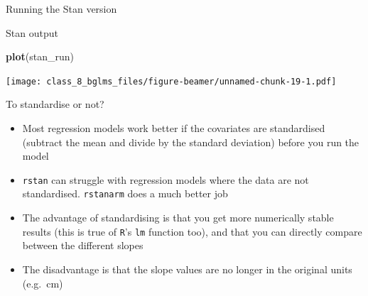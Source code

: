\documentclass[ignorenonframetext,]{beamer}
\newenvironment{Shaded}{\begin{snugshade}}{\end{snugshade}}
\newcommand{\KeywordTok}[1]{\textcolor[rgb]{0.13,0.29,0.53}{\textbf{#1}}}
\newcommand{\DataTypeTok}[1]{\textcolor[rgb]{0.13,0.29,0.53}{#1}}
\newcommand{\StringTok}[1]{\textcolor[rgb]{0.31,0.60,0.02}{#1}}
\newcommand{\OperatorTok}[1]{\textcolor[rgb]{0.81,0.36,0.00}{\textbf{#1}}}
\newcommand{\NormalTok}[1]{#1}
\providecommand{\tightlist}{%
  \setlength{\itemsep}{0pt}\setlength{\parskip}{0pt}}
\begin{document}
\begin{frame}[fragile]{Running the Stan version}

\begin{Shaded}
\end{Shaded}

\end{frame}

\begin{frame}[fragile]{Stan output}

\begin{Shaded}
\begin{Highlighting}[]
\KeywordTok{plot}\NormalTok{(stan_run)}
\end{Highlighting}
\end{Shaded}

\texttt{[image: class\_8\_bglms\_files/figure-beamer/unnamed-chunk-19-1.pdf]}

\end{frame}

\begin{frame}[fragile]{To standardise or not?}

\begin{itemize}
\tightlist
\item
  Most regression models work better if the covariates are standardised
  (subtract the mean and divide by the standard deviation) before you
  run the model
\item
  \texttt{rstan} can struggle with regression models where the data are
  not standardised. \texttt{rstanarm} does a much better job
\item
  The advantage of standardising is that you get more numerically stable
  results (this is true of \texttt{R}'s \texttt{lm} function too), and
  that you can directly compare between the different slopes
\item
  The disadvantage is that the slope values are no longer in the
  original units (e.g.~cm)
\end{itemize}

\end{frame}
\end{document}
